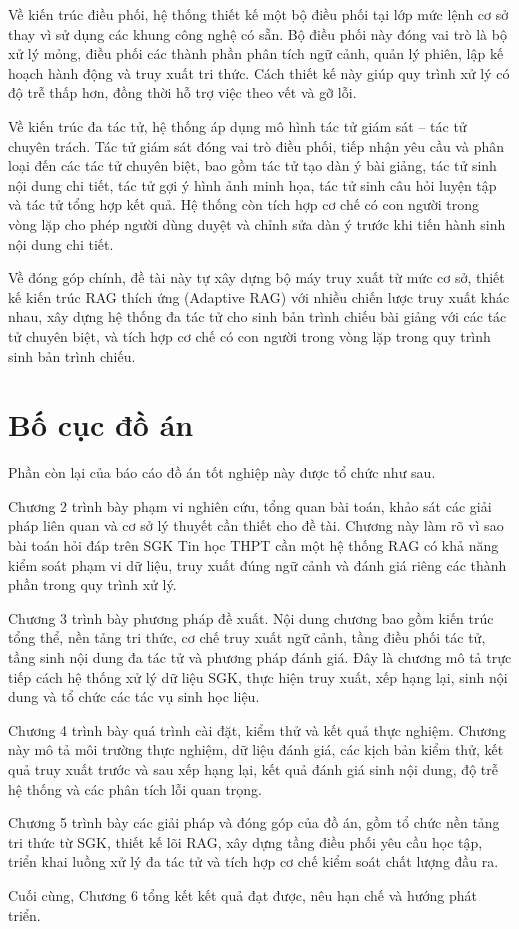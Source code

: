 \documentclass[../DoAn.tex]{subfiles}
\begin{document}
Về kiến trúc điều phối, hệ thống thiết kế một bộ điều phối tại lớp mức lệnh cơ sở thay vì sử dụng các khung công nghệ có sẵn. Bộ điều phối này đóng vai trò là bộ xử lý mỏng, điều phối các thành phần phân tích ngữ cảnh, quản lý phiên, lập kế hoạch hành động và truy xuất tri thức. Cách thiết kế này giúp quy trình xử lý có độ trễ thấp hơn, đồng thời hỗ trợ việc theo vết và gỡ lỗi.

Về kiến trúc đa tác tử, hệ thống áp dụng mô hình tác tử giám sát -- tác tử chuyên trách. Tác tử giám sát đóng vai trò điều phối, tiếp nhận yêu cầu và phân loại đến các tác tử chuyên biệt, bao gồm tác tử tạo dàn ý bài giảng, tác tử sinh nội dung chi tiết, tác tử gợi ý hình ảnh minh họa, tác tử sinh câu hỏi luyện tập và tác tử tổng hợp kết quả. Hệ thống còn tích hợp cơ chế có con người trong vòng lặp cho phép người dùng duyệt và chỉnh sửa dàn ý trước khi tiến hành sinh nội dung chi tiết.

Về đóng góp chính, đề tài này tự xây dựng bộ máy truy xuất từ mức cơ sở, thiết kế kiến trúc RAG thích ứng (Adaptive RAG) với nhiều chiến lược truy xuất khác nhau, xây dựng hệ thống đa tác tử cho sinh bản trình chiếu bài giảng với các tác tử chuyên biệt, và tích hợp cơ chế có con người trong vòng lặp trong quy trình sinh bản trình chiếu.

\section{Bố cục đồ án}
\label{section:1.4}

Phần còn lại của báo cáo đồ án tốt nghiệp này được tổ chức như sau.

Chương 2 trình bày phạm vi nghiên cứu, tổng quan bài toán, khảo sát các giải pháp liên quan và cơ sở lý thuyết cần thiết cho đề tài. Chương này làm rõ vì sao bài toán hỏi đáp trên SGK Tin học THPT cần một hệ thống RAG có khả năng kiểm soát phạm vi dữ liệu, truy xuất đúng ngữ cảnh và đánh giá riêng các thành phần trong quy trình xử lý.

Chương 3 trình bày phương pháp đề xuất. Nội dung chương bao gồm kiến trúc tổng thể, nền tảng tri thức, cơ chế truy xuất ngữ cảnh, tầng điều phối tác tử, tầng sinh nội dung đa tác tử và phương pháp đánh giá. Đây là chương mô tả trực tiếp cách hệ thống xử lý dữ liệu SGK, thực hiện truy xuất, xếp hạng lại, sinh nội dung và tổ chức các tác vụ sinh học liệu.

Chương 4 trình bày quá trình cài đặt, kiểm thử và kết quả thực nghiệm. Chương này mô tả môi trường thực nghiệm, dữ liệu đánh giá, các kịch bản kiểm thử, kết quả truy xuất trước và sau xếp hạng lại, kết quả đánh giá sinh nội dung, độ trễ hệ thống và các phân tích lỗi quan trọng.

Chương 5 trình bày các giải pháp và đóng góp của đồ án, gồm tổ chức nền tảng tri thức từ SGK, thiết kế lõi RAG, xây dựng tầng điều phối yêu cầu học tập, triển khai luồng xử lý đa tác tử và tích hợp cơ chế kiểm soát chất lượng đầu ra.

Cuối cùng, Chương 6 tổng kết kết quả đạt được, nêu hạn chế và hướng phát triển.
\end{document}
